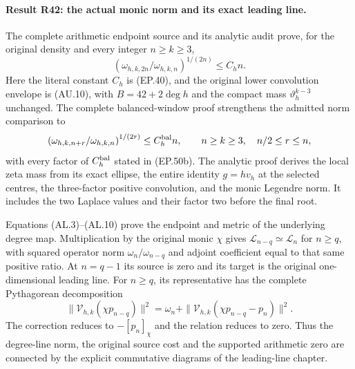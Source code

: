 \paragraph{Result R42: the actual monic norm and its exact leading line.}
The complete arithmetic endpoint source and its analytic audit prove,
for the original density and every integer $n\ge k\ge3$,
\[
 \left(\omega_{h,k,2n}/\omega_{h,k,n}\right)^{1/(2n)}
 \le C_h n.
\]
Here the literal constant $C_h$ is (EP.40), and the original lower
convolution envelope is (AU.10), with $B=42+2\deg h$ and the
compact mass $\vartheta_h^{k-3}$ unchanged. The complete
balanced-window proof strengthens the admitted norm comparison to
\[
 \left(\omega_{h,k,n+r}/\omega_{h,k,n}\right)^{1/(2r)}
 \le C_h^{\rm bal} n,
 \qquad n\ge k\ge3,\quad n/2\le r\le n,
\]
with every factor of $C_h^{\rm bal}$ stated in (EP.50b).
The analytic proof derives the local zeta mass from its exact ellipse,
the entire identity $g=hv_h$ at the selected centres, the three-factor
positive convolution, and the monic Legendre norm. It includes the
two Laplace values and their factor two before the final root.

Equations (AL.3)--(AL.10) prove the endpoint and metric of the
underlying degree map. Multiplication by the original monic $\chi$
gives $\mathcal L_{n-q}\simeq\mathcal L_n$ for $n\ge q$, with
squared operator norm $\omega_n/\omega_{n-q}$ and adjoint
coefficient equal to that same positive ratio. At $n=q-1$ its
source is zero and its target is the original one-dimensional
leading line. For $n\ge q$, its representative has the complete Pythagorean
decomposition
\[
 \|\mathcal V_{h,k}(\chi p_{n-q})\|^2
 =\omega_n+\|\mathcal V_{h,k}(\chi p_{n-q}-p_n)\|^2.
\]
The correction reduces to $-[p_n]_\chi$ and the relation reduces
to zero. Thus the degree-line norm, the original source cost and
the supported arithmetic zero are connected by the explicit
commutative diagrams of the leading-line chapter.

